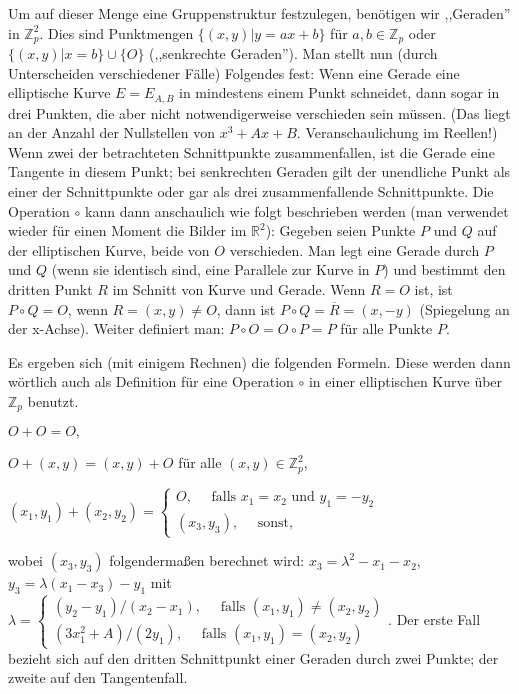 \documentclass[a4paper]{article}
\begin{document}
\begin{multicols}{3}
        Um auf dieser Menge eine Gruppenstruktur festzulegen, benötigen wir ,,Geraden'' in $\mathbb{Z}^2_p$. Dies sind Punktmengen $\{(x,y)|y=ax+b\}$ für $a,b\in\mathbb{Z}_p$ oder $\{(x,y)|x=b\}\cup\{O\}$ (,,senkrechte Geraden''). Man stellt nun (durch Unterscheiden verschiedener Fälle) Folgendes fest: Wenn eine Gerade eine elliptische Kurve $E=E_{A,B}$ in mindestens einem Punkt schneidet, dann sogar in drei Punkten, die aber nicht notwendigerweise verschieden sein müssen. (Das liegt an der Anzahl der Nullstellen von $x^3+Ax+B$. Veranschaulichung im Reellen!)
        Wenn zwei der betrachteten Schnittpunkte zusammenfallen, ist die Gerade eine Tangente in diesem Punkt; bei senkrechten Geraden gilt der unendliche Punkt als einer der Schnittpunkte oder gar als drei zusammenfallende Schnittpunkte.
        Die Operation $\circ$ kann dann anschaulich wie folgt beschrieben werden (man verwendet wieder für einen Moment die Bilder im $\mathbb{R}^2$): Gegeben seien Punkte $P$ und $Q$ auf der elliptischen Kurve, beide von $O$ verschieden. Man legt eine Gerade durch $P$ und $Q$ (wenn sie identisch sind, eine Parallele zur Kurve in $P$) und bestimmt den dritten Punkt $R$ im Schnitt von Kurve und Gerade. Wenn $R=O$ ist, ist $P\circ Q=O$, wenn $R= (x,y)\not=O$, dann ist $P\circ Q=\overline{R}= (x,-y)$ (Spiegelung an der x-Achse).
        Weiter definiert man: $P\circ O=O\circ P=P$ für alle Punkte $P$.

        Es ergeben sich (mit einigem Rechnen) die folgenden Formeln. Diese werden dann wörtlich auch als Definition für eine Operation $\circ$ in einer elliptischen Kurve über $\mathbb{Z}_p$ benutzt.
        \begin{itemize*}
            \item $O+O=O,$
            \item $O+ (x,y) = (x,y) +O$ für alle $(x,y)\in\mathbb{Z}^2_p$,
            \item $(x_1,y_1) + (x_2,y_2) =\begin{cases} O,\quad\text{ falls } x_1=x_2 \text{ und } y_1=-y_2 \\ (x_3,y_3),\quad\text{ sonst,}\end{cases}$
        \end{itemize*}

        wobei $(x_3,y_3)$ folgendermaßen berechnet wird: $x_3=\lambda^2-x_1-x_2$, $y_3=\lambda(x_1-x_3)-y_1$ mit $\lambda=\begin{cases} (y_2-y_1)/(x_2-x_1),\quad\text{ falls } (x_1,y_1)\not= (x_2,y_2)\\ (3x^2_1+A)/(2y_1),\quad\text{ falls } (x_1,y_1) = (x_2,y_2)\end{cases}$.
        Der erste Fall bezieht sich auf den dritten Schnittpunkt einer Geraden durch zwei Punkte; der zweite auf den Tangentenfall.


\end{multicols}
\end{document}
